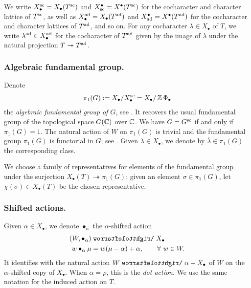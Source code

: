 We write $X^{\sc}_{\bullet} = X_{\bullet}(T^{\sc})$ and $X_{\sc}^{\bullet} = X^{\bullet}(T^{\sc})$ for the cocharacter and character lattice of $T^{\sc}$, as well as $X_{\bullet}^{\ad} = X_{\bullet}(T^{\ad})$ and $X_{\ad}^{\bullet} = X^{\bullet}(T^{\ad})$ for the cocharacter and character lattices of $T^{\ad}$, and so on.
For any cocharacter $\lambda \in X_{\bullet}$ of $T$, we write $\lambda^{\ad} \in X^{\ad}_{\bullet}$ for the cocharacter of $T^{\ad}$ given by the image of $\lambda$ under the natural projection $T \twoheadrightarrow T^{\ad}$. 



\subsubsection{Algebraic fundamental group.}\label{section: borovoi fundamental group}
Denote
\begin{equation}
 \pi_1(G) := X_{\bullet} / X^{\sc}_{\bullet} = X_{\bullet} / \Z\Phi_{\bullet}  
\end{equation}
the \textit{algebraic fundamental group of $G$}, see \cite[Definition 1.3]{Bor98}. It recovers the usual fundamental group of the topological space $G(\C)$ over $\C$. We have $G=G^{\sc}$ if and only if $\pi_1(G)=1$. The natural action of $W$ on $\pi_1(G)$ is trivial and the fundamental group $\pi_1(G)$ is functorial in $G$; see \cite[Lemma 1.2 and its proof]{Bor98}.
%
Given $\lambda \in X_{\bullet}$, we denote by $\overline{\lambda} \in \pi_1(G)$ the corresponding class.


We choose a family of representatives for elements of the fundamental group under the surjection $X_{\bullet}(T) \twoheadrightarrow \pi_1(G)$: given an element $\sigma \in \pi_1(G)$, let $ \chi(\sigma) \in X_{\bullet}(T)$ be the chosen representative. 


\subsubsection{Shifted actions.}\label{section: shifted actions}
Given $\alpha \in X_{\bullet}$, we denote $\bullet_{\alpha}$ the $\alpha$-shifted action
\begin{align*}
    (W, \bullet_{\alpha}) & \acts X_{\bullet} \\
    w \bullet_{\alpha} \mu & = w(\mu - \alpha) + \alpha, \qquad \forall \ w \in W.
\end{align*}
It identifies with the natural action $W \acts \alpha + X_{\bullet}$ of $W$ on the $\alpha$-shifted copy of $X_{\bullet}$.
When $\alpha = \rho$, this is the \emph{dot action}. We use the same notation for the induced action on $T$.

